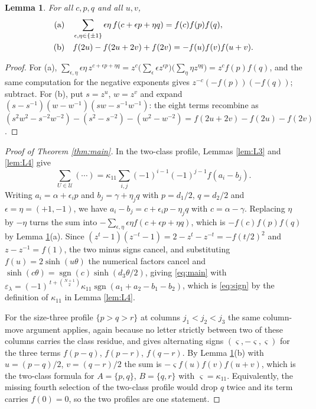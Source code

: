 \documentclass[11pt,reqno]{amsart}
\theoremstyle{plain}
\newtheorem{lemma}[theorem]{Lemma}
\theoremstyle{definition}
\newcommand{\sgn}{\operatorname{sgn}}
\begin{document}
\begin{lemma}\label{lem:L5}
For all $c,p,q$ and all $u,v$,
\begin{align*}
\text{\rm(a)}&\quad \sum_{\epsilon,\eta\in\{\pm1\}}\epsilon\eta\,f(c+\epsilon p+\eta q)=f(c)f(p)f(q),\\
\text{\rm(b)}&\quad f(2u)-f(2u+2v)+f(2v)=-f(u)f(v)f(u+v).
\end{align*}
\end{lemma}

\begin{proof}
For (a), $\sum_{\epsilon,\eta}\epsilon\eta\,z^{c+\epsilon p+\eta q}
=z^{c}\bigl(\sum_\epsilon\epsilon z^{\epsilon p}\bigr)\bigl(\sum_\eta\eta z^{\eta q}\bigr)
=z^{c}f(p)f(q)$, and the same computation for the negative exponents gives
$z^{-c}(-f(p))(-f(q))$; subtract. For (b), put $s=z^u$, $w=z^v$ and expand
$(s-s^{-1})(w-w^{-1})(sw-s^{-1}w^{-1})$: the eight terms recombine as
$(s^2w^2-s^{-2}w^{-2})-(s^2-s^{-2})-(w^2-w^{-2})=f(2u+2v)-f(2u)-f(2v)$.
\end{proof}

\begin{proof}[Proof of Theorem \ref{thm:main}]
In the two-class profile, Lemmas \ref{lem:L3} and \ref{lem:L4} give
\[
\sum_{U\in\mathcal U}(\cdots)=\kappa_{11}\sum_{i,j}(-1)^{i-1}(-1)^{j-1}f(a_i-b_j).
\]
Writing $a_i=\alpha+\epsilon_ip$ and $b_j=\gamma+\eta_jq$ with $p=d_1/2$, $q=d_2/2$ and
$\epsilon=\eta=(+1,-1)$, we have $a_i-b_j=c+\epsilon_ip-\eta_jq$ with $c=\alpha-\gamma$. Replacing
$\eta$ by $-\eta$ turns the sum into $-\sum_{\epsilon,\eta}\epsilon\eta f(c+\epsilon p+\eta q)$,
which is $-f(c)f(p)f(q)$ by Lemma \ref{lem:L5}(a). Since
$(z^t-1)(z^{-t}-1)=2-z^t-z^{-t}=-f(t/2)^2$ and $z-z^{-1}=f(1)$, the two minus signs cancel, and
substituting $f(u)=2\sinh(u\theta)$ the numerical factors cancel and
$\sinh(c\theta)=\sgn(c)\sinh(d_3\theta/2)$, giving \eqref{eq:main} with
$\varepsilon_\lambda=(-1)^{\,t+\binom{N+1}{2}}\kappa_{11}\sgn(a_1+a_2-b_1-b_2)$, which is
\eqref{eq:sign} by the definition of $\kappa_{11}$ in Lemma \ref{lem:L4}.

For the size-three profile $\{p>q>r\}$ at columns $j_1<j_2<j_3$ the same column-move argument
applies, again because no letter strictly between two of these columns carries the class residue,
and gives alternating signs $(\varsigma,-\varsigma,\varsigma)$ for the three terms $f(p-q)$,
$f(p-r)$, $f(q-r)$. By Lemma \ref{lem:L5}(b) with $u=(p-q)/2$, $v=(q-r)/2$ the sum is
$-\varsigma f(u)f(v)f(u+v)$, which is the two-class formula for $A=\{p,q\}$, $B=\{q,r\}$ with
$\varsigma=\kappa_{11}$. Equivalently, the missing fourth selection of the two-class profile would
drop $q$ twice and its term carries $f(0)=0$, so the two profiles are one statement.
\end{proof}
\end{document}
